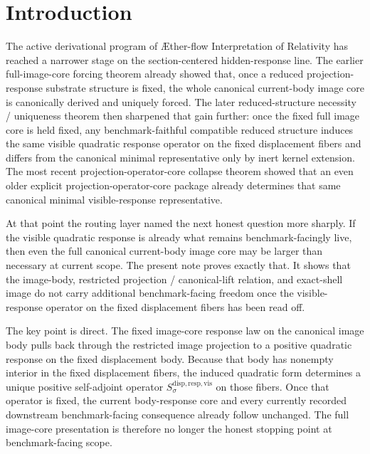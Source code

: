 \documentclass[11pt]{article}
\newcommand{\Aflow}{\AE{}ther-flow}
\newcommand{\TheoryName}{\Aflow{} Interpretation of Relativity}
\newcommand{\VisibleResponseOperator}[1]{S_{#1}^{\mathrm{disp,resp,vis}}}
\begin{document}
\section{Introduction}

The active derivational program of \TheoryName{} has reached a narrower stage on the section-centered hidden-response line. The earlier full-image-core forcing theorem already showed that, once a reduced projection-response substrate structure is fixed, the whole canonical current-body image core is canonically derived and uniquely forced. The later reduced-structure necessity / uniqueness theorem then sharpened that gain further: once the fixed full image core is held fixed, any benchmark-faithful compatible reduced structure induces the same visible quadratic response operator on the fixed displacement fibers and differs from the canonical minimal representative only by inert kernel extension. The most recent projection-operator-core collapse theorem showed that an even older explicit projection-operator-core package already determines that same canonical minimal visible-response representative.

At that point the routing layer named the next honest question more sharply. If the visible quadratic response is already what remains benchmark-facingly live, then even the full canonical current-body image core may be larger than necessary at current scope. The present note proves exactly that. It shows that the image-body, restricted projection / canonical-lift relation, and exact-shell image do not carry additional benchmark-facing freedom once the visible-response operator on the fixed displacement fibers has been read off.

The key point is direct. The fixed image-core response law on the canonical image body pulls back through the restricted image projection to a positive quadratic response on the fixed displacement body. Because that body has nonempty interior in the fixed displacement fibers, the induced quadratic form determines a unique positive self-adjoint operator \(\VisibleResponseOperator{\sigma}\) on those fibers. Once that operator is fixed, the current body-response core and every currently recorded downstream benchmark-facing consequence already follow unchanged. The full image-core presentation is therefore no longer the honest stopping point at benchmark-facing scope.
\end{document}
